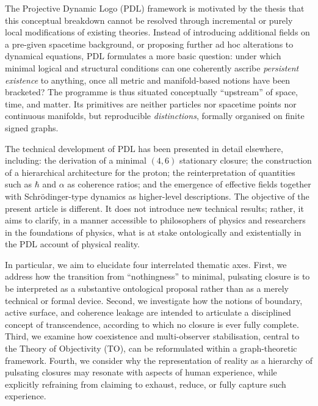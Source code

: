 \documentclass{article}
\theoremstyle{definition}
\newcommand{\PDL}{\ensuremath{\mathrm{PDL}}}
\begin{document}
The Projective Dynamic Logo (\PDL) framework is motivated by the thesis that this conceptual breakdown cannot be resolved through incremental or purely local modifications of existing theories.
Instead of introducing additional fields on a pre-given spacetime background, or proposing further ad hoc alterations to dynamical equations, \PDL{} formulates a more basic question: under which minimal logical and structural conditions can one coherently ascribe \emph{persistent existence} to anything, once all metric and manifold-based notions have been bracketed?%
\cite{PDL_Main_2026,PDL_Position_2026}
The programme is thus situated conceptually “upstream” of space, time, and matter.
Its primitives are neither particles nor spacetime points nor continuous manifolds, but reproducible \emph{distinctions}, formally organised on finite signed graphs.

The technical development of \PDL{} has been presented in detail elsewhere, including: the derivation of a minimal \((4,6)\) stationary closure; the construction of a hierarchical architecture for the proton; the reinterpretation of quantities such as \(\hbar\) and \(\alpha\) as coherence ratios; and the emergence of effective fields together with Schr{\"o}dinger-type dynamics as higher-level descriptions.%
\cite{PDL_Main_2026,PDL_Alpha_2026_v2,PDL_Proton_Architecture_2026_v2,PDL_Effective_Fields_2026,PDL_Schroedinger_Dynamics_2026_v2}
The objective of the present article is different.
It does not introduce new technical results; rather, it aims to clarify, in a manner accessible to philosophers of physics and researchers in the foundations of physics, what is at stake ontologically and existentially in the \PDL{} account of physical reality.

In particular, we aim to elucidate four interrelated thematic axes.  
First, we address how the transition from “nothingness” to minimal, pulsating closure is to be interpreted as a substantive ontological proposal rather than as a merely technical or formal device.%
\cite{PDL_Main_2026,PDL_TO_Dialogue_2026}
Second, we investigate how the notions of boundary, active surface, and coherence leakage are intended to articulate a disciplined concept of transcendence, according to which no closure is ever fully complete.%
\cite{PDL_Topological_2026,PDL_Exponent18_2026_Refined,PDL_Position_2026}
Third, we examine how coexistence and multi-observer stabilisation, central to the Theory of Objectivity (TO), can be reformulated within a graph-theoretic framework.%
\cite{PDL_TO_Dialogue_2026,PDL_Global_Mapping_2026_v3}
Fourth, we consider why the representation of reality as a hierarchy of pulsating closures may resonate with aspects of human experience, while explicitly refraining from claiming to exhaust, reduce, or fully capture such experience.
\end{document}
